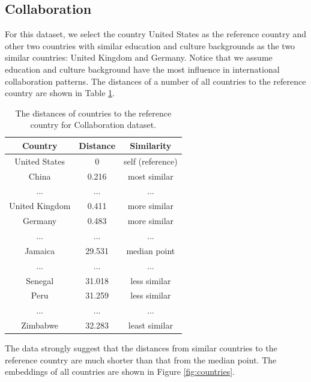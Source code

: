 \documentclass[conference]{IEEEtran}
\begin{document}
\subsection{Collaboration}
For this dataset, we select the country United States as the reference country and other two countries with similar education and culture backgrounds as the two similar countries: United Kingdom and Germany.
Notice that we assume education and culture background have the most influence in international collaboration patterns.
The distances of a number of all countries to the reference country are shown in Table \ref{tab:countries-distance}.
\begin{table}[!ht]
	\centering
	\caption{
		The distances of countries to the reference country for Collaboration dataset.
	}
	\begin{tabular}{ccc} \hline \rowcolor{blue!30}
		Country & Distance & Similarity \\ \hline
		United States & 0 & self (reference) \\ \hline
		China & 0.216 & most similar \\ \hline
		... & ... & ... \\ \hline
		United Kingdom & 0.411 & more similar \\ \hline
		Germany & 0.483 & more similar \\ \hline
		... & ... & ... \\ \hline
		Jamaica & 29.531 & median point \\ \hline
		... & ... & ... \\ \hline
		Senegal & 31.018 & less similar \\ \hline
		Peru & 31.259 & less similar \\ \hline
		... & ... & ... \\ \hline
		Zimbabwe & 32.283 & least similar \\ \hline
	\end{tabular}
	\label{tab:countries-distance}
\end{table}
The data strongly suggest that the distances from similar countries to the reference country are much shorter than that from the median point.
The embeddings of all countries are shown in Figure \ref{fig:countries}.
\end{document}
